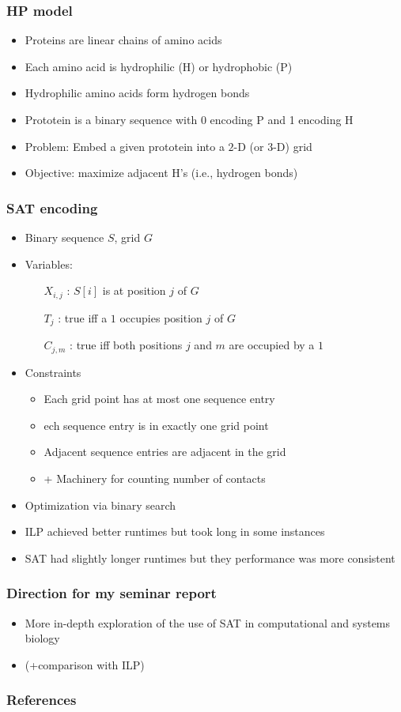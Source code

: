 \documentclass[handout]{beamer}
\begin{document}
\begin{frame}
\frametitle{HP model}
\begin{itemize}
\item Proteins are linear chains of amino acids
\item Each amino acid is hydrophilic (H) or hydrophobic (P)
\item Hydrophilic amino acids form hydrogen bonds 
\item Prototein is a binary sequence with 0 encoding P and 1 encoding H
\item Problem: Embed a given prototein into a $2$-D (or $3$-D) grid
\item Objective: maximize adjacent H's (i.e., hydrogen bonds)
\end{itemize}
\end{frame}

\begin{frame}
\frametitle{SAT encoding}
\begin{itemize}
\item Binary sequence $S$, grid $G$
\item Variables:
\begin{itemize}
\item[$X_{i,j}$]: $S[i]$ is at position $j$ of $G$
\item [$T_j$]: true iff a $1$ occupies position $j$ of $G$
\item [$C_{j,m}$]: true iff both positions $j$ and $m$ are occupied by a $1$
\end{itemize}
\item Constraints
\begin{itemize}
\item Each grid point has at most one sequence entry
\item ech sequence entry is in exactly one grid point
\item Adjacent sequence entries are adjacent in the grid
\item + Machinery for counting number of contacts
\end{itemize}
\item Optimization via binary search
\item ILP achieved better runtimes but took long in some instances
\item SAT had slightly longer runtimes but they performance was more consistent
\end{itemize}
\end{frame}

\begin{frame}
\frametitle{Direction for my seminar report}
\begin{itemize}
\item More in-depth exploration of the use of SAT in computational and systems biology
\item (+comparison with ILP)
\end{itemize}
\end{frame}

\begin{frame}[allowframebreaks]
\frametitle{References}
\printbibliography
\end{frame}
\end{document}
